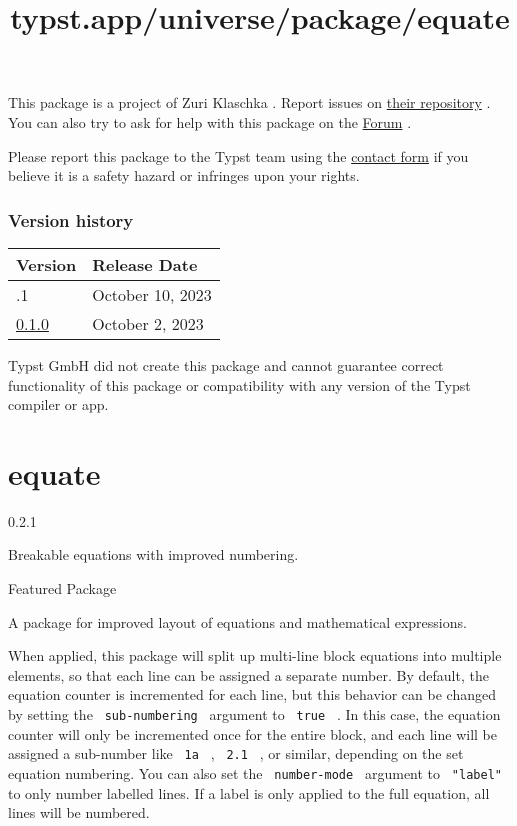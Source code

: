 This package is a project of Zuri Klaschka . Report issues on
\href{https://github.com/pklaschka/typst-hidden-bib}{their repository} .
You can also try to ask for help with this package on the
\href{https://forum.typst.app}{Forum} .

Please report this package to the Typst team using the
\href{https://typst.app/contact}{contact form} if you believe it is a
safety hazard or infringes upon your rights.

\label{versions}
\subsubsection{Version history}\label{version-history}

\begin{longtable}[]{@{}ll@{}}
\toprule\noalign{}
Version & Release Date \\
\midrule\noalign{}
\endhead
\bottomrule\noalign{}
\endlastfoot
0.1.1 & October 10, 2023 \\
\href{https://typst.app/universe/package/hidden-bib/0.1.0/}{0.1.0} &
October 2, 2023 \\
\end{longtable}

Typst GmbH did not create this package and cannot guarantee correct
functionality of this package or compatibility with any version of the
Typst compiler or app.


\title{typst.app/universe/package/equate}

\label{banner}
\section{equate}\label{equate}

{ 0.2.1 }

Breakable equations with improved numbering.

{ } Featured Package

\label{readme}
A package for improved layout of equations and mathematical expressions.

When applied, this package will split up multi-line block equations into
multiple elements, so that each line can be assigned a separate number.
By default, the equation counter is incremented for each line, but this
behavior can be changed by setting the \texttt{\ sub-numbering\ }
argument to \texttt{\ true\ } . In this case, the equation counter will
only be incremented once for the entire block, and each line will be
assigned a sub-number like \texttt{\ 1a\ } , \texttt{\ 2.1\ } , or
similar, depending on the set equation numbering. You can also set the
\texttt{\ number-mode\ } argument to \texttt{\ "label"\ } to only number
labelled lines. If a label is only applied to the full equation, all
lines will be numbered.


